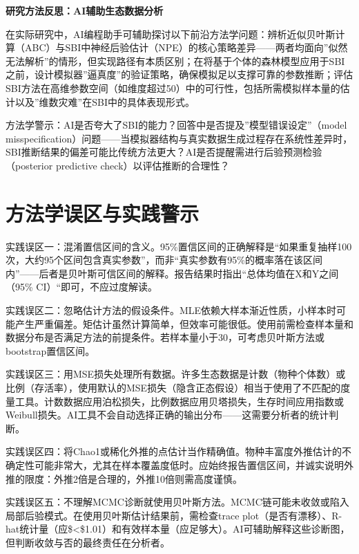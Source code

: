 \documentclass[
  twoside,12pt,fontset=none]{ctexbook}
\renewenvironment{quote}{%
  \def\FrameCommand{{\color{quote-border}\vrule width 4pt}\hspace{10pt}}%
  \MakeFramed {\advance\hsize-\width \FrameRestore\noindent\ignorespaces}%
}{%
  \endMakeFramed
}
\begin{document}
\begin{quote}
\textbf{研究方法反思：AI辅助生态数据分析}

在实际研究中，AI编程助手可辅助探讨以下前沿方法学问题：辨析近似贝叶斯计算（ABC）与SBI中神经后验估计（NPE）的核心策略差异------两者均面向''似然无法解析''的情形，但实现路径有本质区别；在将基于个体的森林模型应用于SBI之前，设计模拟器''逼真度''的验证策略，确保模拟足以支撑可靠的参数推断；评估SBI方法在高维参数空间（如维度超过50）中的可行性，包括所需模拟样本量的估计以及''维数灾难''在SBI中的具体表现形式。

方法学警示：AI是否夸大了SBI的能力？回答中是否提及''模型错误设定''（model misspecification）问题------当模拟器结构与真实数据生成过程存在系统性差异时，SBI推断结果的偏差可能比传统方法更大？AI是否提醒需进行后验预测检验（posterior predictive check）以评估推断的合理性？
\end{quote}

\hypertarget{ux65b9ux6cd5ux5b66ux8befux533aux4e0eux5b9eux8df5ux8b66ux793a-2}{%
\section{方法学误区与实践警示}\label{ux65b9ux6cd5ux5b66ux8befux533aux4e0eux5b9eux8df5ux8b66ux793a-2}}

实践误区一：混淆置信区间的含义。95\%置信区间的正确解释是``如果重复抽样100次，大约95个区间包含真实参数''，而非``真实参数有95\%的概率落在该区间内''------后者是贝叶斯可信区间的解释。报告结果时指出``总体均值在X和Y之间（95\% CI）``即可，不应过度解读。

实践误区二：忽略估计方法的假设条件。MLE依赖大样本渐近性质，小样本时可能产生严重偏差。矩估计虽然计算简单，但效率可能很低。使用前需检查样本量和数据分布是否满足方法的前提条件。若样本量小于30，可考虑贝叶斯方法或bootstrap置信区间。

实践误区三：用MSE损失处理所有数据。许多生态数据是计数（物种个体数）或比例（存活率），使用默认的MSE损失（隐含正态假设）相当于使用了不匹配的度量工具。计数数据应用泊松损失，比例数据应用贝塔损失，生存时间应用指数或Weibull损失。AI工具不会自动选择正确的输出分布------这需要分析者的统计判断。

实践误区四：将Chao1或稀化外推的点估计当作精确值。物种丰富度外推估计的不确定性可能非常大，尤其在样本覆盖度低时。应始终报告置信区间，并诚实说明外推的限度：外推2倍是合理的，外推10倍则需高度谨慎。

实践误区五：不理解MCMC诊断就使用贝叶斯方法。MCMC链可能未收敛或陷入局部后验模式。在使用贝叶斯估计结果前，需检查trace plot（是否有漂移）、R-hat统计量（应\$\textless\$1.01）和有效样本量（应足够大）。AI可辅助解释这些诊断图，但判断收敛与否的最终责任在分析者。
\end{document}
